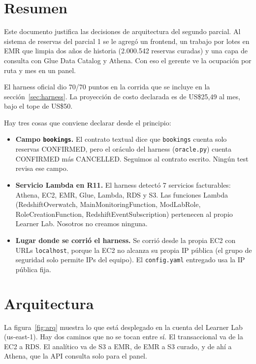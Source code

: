 \documentclass[11pt,letterpaper]{article}
\begin{document}
\section{Resumen}
Este documento justifica las decisiones de arquitectura del segundo parcial. Al sistema de reservas del parcial 1 se le agregó un frontend, un trabajo por lotes en EMR que limpia dos años de historia (2.000.542 reservas curadas) y una capa de consulta con Glue Data Catalog y Athena. Con eso el gerente ve la ocupación por ruta y mes en un panel.

El harness oficial dio 70/70 puntos en la corrida que se incluye en la sección~\ref{sec:harness}. La proyección de costo declarada es de US\$25,49 al mes, bajo el tope de US\$50.

Hay tres cosas que conviene declarar desde el principio:
\begin{itemize}
  \item \textbf{Campo \texttt{bookings}.} El contrato textual dice que \texttt{bookings} cuenta solo reservas CONFIRMED, pero el oráculo del harness (\texttt{oracle.py}) cuenta CONFIRMED más CANCELLED. Seguimos al contrato escrito. Ningún test revisa ese campo.
  \item \textbf{Servicio Lambda en R11.} El harness detectó 7 servicios facturables: Athena, EC2, EMR, Glue, Lambda, RDS y S3. Las funciones Lambda (RedshiftOverwatch, MainMonitoringFunction, ModLabRole, RoleCreationFunction, RedshiftEventSubscription) pertenecen al propio Learner Lab. Nosotros no creamos ninguna.
  \item \textbf{Lugar donde se corrió el harness.} Se corrió desde la propia EC2 con URLs \texttt{localhost}, porque la EC2 no alcanza su propia IP pública (el grupo de seguridad solo permite IPs del equipo). El \texttt{config.yaml} entregado usa la IP pública fija.
\end{itemize}

\section{Arquitectura}
\label{sec:arq}
La figura~\ref{fig:arq} muestra lo que está desplegado en la cuenta del Learner Lab (us-east-1). Hay dos caminos que no se tocan entre sí. El transaccional va de la EC2 a RDS. El analítico va de S3 a EMR, de EMR a S3 curado, y de ahí a Athena, que la API consulta solo para el panel.
\end{document}
